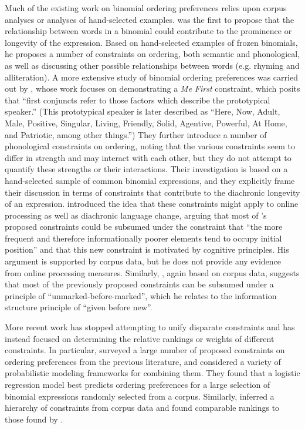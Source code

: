 \documentclass[authoryear]{elsarticle}
\begin{document}
	Much of the existing work on binomial ordering preferences relies upon corpus analyses or analyses of hand-selected examples. \citet{Malkiel:1959vs} was the first to propose that the relationship between words in a binomial could contribute to the prominence or longevity of the expression. Based on hand-selected examples of frozen binomials, he proposes a number of constraints on ordering, both semantic and phonological, as well as discussing other possible relationships between words (e.g. rhyming and alliteration). A more extensive study of binomial ordering preferences was carried out by \citet{Cooper:1975uz}, whose work focuses on demonstrating a \emph{Me First} constraint, which posits that ``first conjuncts refer to those factors which describe the prototypical speaker.'' (This prototypical speaker is later described as ``Here, Now, Adult, Male, Positive, Singular, Living, Friendly, Solid, Agentive, Powerful, At Home, and Patriotic, among other things.'') They further introduce a number of phonological constraints on ordering, noting that the various constraints seem to differ in strength and may interact with each other, but they do not attempt to quantify these strengths or their interactions. Their investigation is based on a hand-selected sample of common binomial expressions, and they explicitly frame their discussion in terms of constraints that contribute to the diachronic longevity of an expression. \citet{FenkOczlon:1989uq} introduced the idea that these constraints might apply to online processing as well as diachronic language change, arguing that most of \citeauthor{Cooper:1975uz}'s proposed constraints could be subsumed under the constraint that ``the more frequent and therefore informationally poorer elements tend to occupy initial position'' and that this new constraint is motivated by cognitive principles. His argument is supported by corpus data, but he does not provide any evidence from online processing measures. Similarly, \citet{Sobkowiak:1993ir}, again based on corpus data, suggests that most of the previously proposed constraints can be subsumed under a principle of ``unmarked-before-marked'', which he relates to the information structure principle of ``given before new''.
	
	More recent work has stopped attempting to unify disparate constraints and has instead focused on determining the relative rankings or weights of different constraints. In particular, \citet{Benor:2006gv} surveyed a large number of proposed constraints on ordering preferences from the previous literature, and considered a variety of probabilistic modeling frameworks for combining them. They found that a logistic regression model best predicts ordering preferences for a large selection of binomial expressions randomly selected from a corpus. Similarly, \citet{MOLLIN:2012ia} inferred a hierarchy of constraints from corpus data and found comparable rankings to those found by \citeauthor{Benor:2006gv}.
\end{document}
